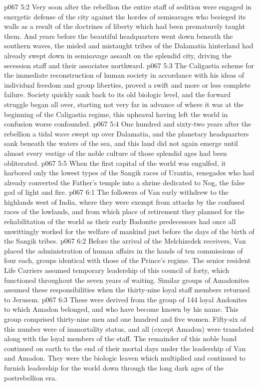 \vs p067 5:2 Very soon after the rebellion the entire staff of sedition were engaged in energetic defense of the city against the hordes of semisavages who besieged its walls as a result of the doctrines of liberty which had been prematurely taught them. And years before the beautiful headquarters went down beneath the southern waves, the misled and mistaught tribes of the Dalamatia hinterland had already swept down in semisavage assault on the splendid city, driving the secession staff and their associates northward.
\vs p067 5:3 The Caligastia scheme for the immediate reconstruction of human society in accordance with his ideas of individual freedom and group liberties, proved a swift and more or less complete failure. Society quickly sank back to its old biologic level, and the forward struggle began all over, starting not very far in advance of where it was at the beginning of the Caligastia regime, this upheaval having left the world in confusion worse confounded.
\vs p067 5:4 \pc One hundred and sixty\hyp{}two years after the rebellion a tidal wave swept up over Dalamatia, and the planetary headquarters sank beneath the waters of the sea, and this land did not again emerge until almost every vestige of the noble culture of those splendid ages had been obliterated.
\vs p067 5:5 When the first capital of the world was engulfed, it harbored only the lowest types of the Sangik races of Urantia, renegades who had already converted the Father’s temple into a shrine dedicated to Nog, the false god of light and fire.
\vs p067 6:1 The followers of Van early withdrew to the highlands west of India, where they were exempt from attacks by the confused races of the lowlands, and from which place of retirement they planned for the rehabilitation of the world as their early Badonite predecessors had once all unwittingly worked for the welfare of mankind just before the days of the birth of the Sangik tribes.
\vs p067 6:2 Before the arrival of the Melchizedek receivers, Van placed the administration of human affairs in the hands of ten commissions of four each, groups identical with those of the Prince’s regime. The senior resident Life Carriers assumed temporary leadership of this council of forty, which functioned throughout the seven years of waiting. Similar groups of Amadonites assumed these responsibilities when the thirty\hyp{}nine loyal staff members returned to Jerusem.
\vs p067 6:3 These  were derived from the group of 144 loyal Andonites to which Amadon belonged, and who have become known by his name. This group comprised thirty\hyp{}nine men and one hundred and five women. Fifty\hyp{}six of this number were of immortality status, and all (except Amadon) were translated along with the loyal members of the staff. The remainder of this noble band continued on earth to the end of their mortal days under the leadership of Van and Amadon. They were the biologic leaven which multiplied and continued to furnish leadership for the world down through the long dark ages of the postrebellion era.
